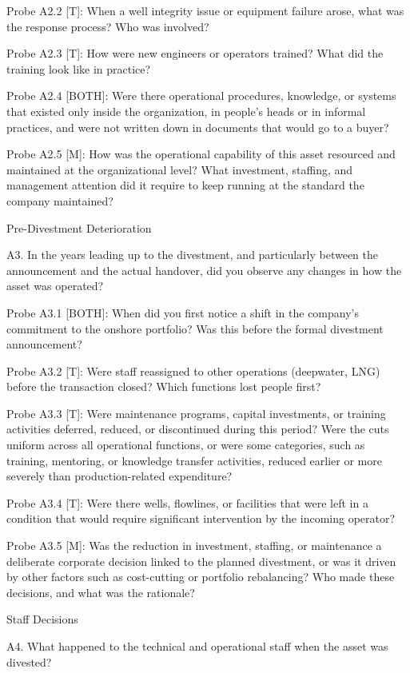 \documentclass[twoside,fontset=lmodern]{mitthesis}
\begin{document}
Probe A2.2 {[}T{]}: When a well integrity issue or equipment failure
arose, what was the response process? Who was involved?

Probe A2.3 {[}T{]}: How were new engineers or operators trained? What
did the training look like in practice?

Probe A2.4 {[}BOTH{]}: Were there operational procedures, knowledge, or
systems that existed only inside the organization, in people's heads or
in informal practices, and were not written down in documents that would
go to a buyer?

Probe A2.5 {[}M{]}: How was the operational capability of this asset
resourced and maintained at the organizational level? What investment,
staffing, and management attention did it require to keep running at the
standard the company maintained?

Pre-Divestment Deterioration

A3. In the years leading up to the divestment, and particularly between
the announcement and the actual handover, did you observe any changes in
how the asset was operated?

Probe A3.1 {[}BOTH{]}: When did you first notice a shift in the
company's commitment to the onshore portfolio? Was this before the
formal divestment announcement?

Probe A3.2 {[}T{]}: Were staff reassigned to other operations
(deepwater, LNG) before the transaction closed? Which functions lost
people first?

Probe A3.3 {[}T{]}: Were maintenance programs, capital investments, or
training activities deferred, reduced, or discontinued during this
period? Were the cuts uniform across all operational functions, or were
some categories, such as training, mentoring, or knowledge transfer
activities, reduced earlier or more severely than production-related
expenditure?

Probe A3.4 {[}T{]}: Were there wells, flowlines, or facilities that were
left in a condition that would require significant intervention by the
incoming operator?

Probe A3.5 {[}M{]}: Was the reduction in investment, staffing, or
maintenance a deliberate corporate decision linked to the planned
divestment, or was it driven by other factors such as cost-cutting or
portfolio rebalancing? Who made these decisions, and what was the
rationale?

Staff Decisions

A4. What happened to the technical and operational staff when the asset
was divested?
\end{document}
